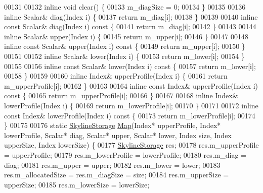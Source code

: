\begin{DoxyCode}
00131 
00132     \textcolor{keyword}{inline} \textcolor{keywordtype}{void} clear() \{
00133         m\_diagSize = 0;
00134     \}
00135 
00136     \textcolor{keyword}{inline} Scalar& diag(Index i) \{
00137         \textcolor{keywordflow}{return} m\_diag[i];
00138     \}
00139 
00140     \textcolor{keyword}{inline} \textcolor{keyword}{const} Scalar& diag(Index i)\textcolor{keyword}{ const }\{
00141         \textcolor{keywordflow}{return} m\_diag[i];
00142     \}
00143 
00144     \textcolor{keyword}{inline} Scalar& upper(Index i) \{
00145         \textcolor{keywordflow}{return} m\_upper[i];
00146     \}
00147 
00148     \textcolor{keyword}{inline} \textcolor{keyword}{const} Scalar& upper(Index i)\textcolor{keyword}{ const }\{
00149         \textcolor{keywordflow}{return} m\_upper[i];
00150     \}
00151 
00152     \textcolor{keyword}{inline} Scalar& lower(Index i) \{
00153         \textcolor{keywordflow}{return} m\_lower[i];
00154     \}
00155 
00156     \textcolor{keyword}{inline} \textcolor{keyword}{const} Scalar& lower(Index i)\textcolor{keyword}{ const }\{
00157         \textcolor{keywordflow}{return} m\_lower[i];
00158     \}
00159 
00160     \textcolor{keyword}{inline} Index& upperProfile(Index i) \{
00161         \textcolor{keywordflow}{return} m\_upperProfile[i];
00162     \}
00163 
00164     \textcolor{keyword}{inline} \textcolor{keyword}{const} Index& upperProfile(Index i)\textcolor{keyword}{ const }\{
00165         \textcolor{keywordflow}{return} m\_upperProfile[i];
00166     \}
00167 
00168     \textcolor{keyword}{inline} Index& lowerProfile(Index i) \{
00169         \textcolor{keywordflow}{return} m\_lowerProfile[i];
00170     \}
00171 
00172     \textcolor{keyword}{inline} \textcolor{keyword}{const} Index& lowerProfile(Index i)\textcolor{keyword}{ const }\{
00173         \textcolor{keywordflow}{return} m\_lowerProfile[i];
00174     \}
00175 
00176     \textcolor{keyword}{static} \hyperlink{class_eigen_1_1_skyline_storage}{SkylineStorage} \hyperlink{group___core___module_class_eigen_1_1_map}{Map}(Index* upperProfile, Index* lowerProfile, Scalar* diag, 
      Scalar* upper, Scalar* lower, Index size, Index upperSize, Index lowerSize) \{
00177         \hyperlink{class_eigen_1_1_skyline_storage}{SkylineStorage} res;
00178         res.m\_upperProfile = upperProfile;
00179         res.m\_lowerProfile = lowerProfile;
00180         res.m\_diag = diag;
00181         res.m\_upper = upper;
00182         res.m\_lower = lower;
00183         res.m\_allocatedSize = res.m\_diagSize = size;
00184         res.m\_upperSize = upperSize;
00185         res.m\_lowerSize = lowerSize;

\end{DoxyCode}
